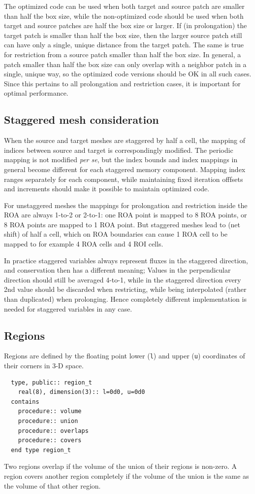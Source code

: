 \documentclass[paper=a4,fontsize=11pt]{scrartcl}
\numberwithin{equation}{section}		%
\numberwithin{figure}{section}			%
\numberwithin{table}{section}				%
\newcommand{\codecolor}{\color{Blue}}
\newcommand{\Code}[1]{{\codecolor\texttt{#1}}}
\begin{document}
The optimized code can be used when both target and source patch are smaller than half the box size, while the non-optimized code should be used when both target and source patches are half the box size or larger.  If (in prolongation) the target patch is smaller than half the box size, then the larger source patch still can have only a single, unique distance from the target patch.  The same is true for restriction from a source patch smaller than half the box size.  In general, a patch smaller than half the box size can only overlap with a neighbor patch in a single, unique way, so the optimized code versions should be OK in all such cases. Since this pertains to all prolongation and restriction cases, it is important for optimal performance.

\subsection{Staggered mesh consideration}
When the source and target meshes are staggered by half a cell, the mapping of indices between source and target is correspondingly modified.  The periodic mapping is not modified \textit{per se}, but the index bounds and index mappings in general become different for each staggered memory component.  Mapping index ranges separately for each component, while maintaining fixed iteration offfsets and increments should make it possible to maintain optimized code.

For unstaggered meshes the mappings for prolongation and restriction inside the ROA are always 1-to-2 or 2-to-1: one ROA point is mapped to 8 ROA points, or 8 ROA points are mapped to 1 ROA point.  But staggered meshes lead to (net shift) of half a cell, which on ROA boundaries can cause 1 ROA cell to be mapped to for example 4 ROA cells and 4 ROI cells.

In practice staggered variables always represent fluxes in the staggered direction, and conservation then has a different meaning;  Values in the perpendicular direction should still be averaged 4-to-1, while in the staggered direction every 2nd value should be discarded when restricting, while being interpolated (rather than duplicated) when prolonging.  Hence completely different implementation is needed for staggered variables in any case.

\subsection {Regions}
Regions are defined by the floating point lower (\Code{l}) and upper (\Code{u}) coordinates of their corners in 3-D space.
{\codecolor \begin{verbatim}
  type, public:: region_t
    real(8), dimension(3):: l=0d0, u=0d0
  contains
    procedure:: volume
    procedure:: union
    procedure:: overlaps
    procedure:: covers
  end type region_t
\end{verbatim}}
Two regions overlap if the volume of the union of their regions is non-zero.  A region covers another region completely if the volume of the union is the same as the volume of that other region.
\end{document}
